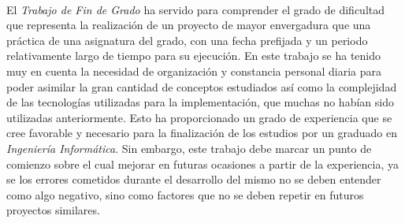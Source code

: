 \documentclass{subfiles}
\begin{document}
      \paragraph{}
      El \emph{Trabajo de Fin de Grado} ha servido para comprender el grado de dificultad que representa la realización de un proyecto de mayor envergadura que una práctica de una asignatura del grado, con una fecha prefijada y un periodo relativamente largo de tiempo para su ejecución. En este trabajo se ha tenido muy en cuenta la necesidad de organización y constancia personal diaria para poder asimilar la gran cantidad de conceptos estudiados así como la complejidad de las tecnologías utilizadas para la implementación, que muchas no habían sido utilizadas anteriormente. Esto ha proporcionado un grado de experiencia que se cree favorable y necesario para la finalización de los estudios por un graduado en \emph{Ingeniería Informática}. Sin embargo, este trabajo debe marcar un punto de comienzo sobre el cual mejorar en futuras ocasiones a partir de la experiencia, ya se los errores cometidos durante el desarrollo del mismo no se deben entender como algo negativo, sino como factores que no se deben repetir en futuros proyectos similares.
\end{document}
